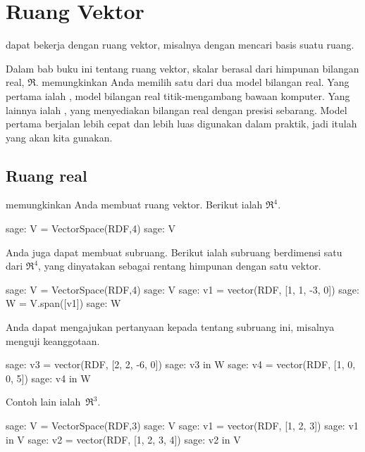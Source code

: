 \chapter{Ruang Vektor}

\Sage{} dapat bekerja dengan ruang vektor, misalnya dengan mencari basis
suatu ruang.

Dalam bab buku ini tentang ruang vektor, skalar berasal
dari himpunan bilangan real, $\Re$.
\Sage{} memungkinkan Anda memilih satu dari dua model bilangan real.
Yang pertama ialah , model bilangan real titik-mengambang
bawaan komputer.
Yang lainnya ialah , yang menyediakan bilangan real 
dengan presisi sebarang.
Model pertama berjalan lebih cepat
dan lebih luas digunakan dalam praktik, jadi itulah yang akan kita gunakan.
 




\section{Ruang real}

\Sage{} memungkinkan Anda membuat ruang vektor.
Berikut ialah $\Re^4$.
\begin{sagecommandline}
sage: V = VectorSpace(RDF,4)
sage: V
\end{sagecommandline}
Anda juga dapat membuat subruang.
Berikut ialah subruang berdimensi satu dari $\Re^4$, yang dinyatakan sebagai rentang
himpunan dengan satu vektor.
\begin{sagecommandline}
sage: V = VectorSpace(RDF,4)
sage: V
sage: v1 = vector(RDF, [1, 1, -3, 0])
sage: W = V.span([v1])
sage: W
\end{sagecommandline}

Anda dapat mengajukan pertanyaan kepada \Sage{} tentang subruang ini, misalnya 
menguji keanggotaan. 
\begin{sagecommandline}
sage: v3 = vector(RDF, [2, 2, -6, 0])
sage: v3 in W
sage: v4 = vector(RDF, [1, 0, 0, 5])
sage: v4 in W
\end{sagecommandline}

Contoh lain ialah~$\Re^3$.
\begin{sagecommandline}
sage: V = VectorSpace(RDF,3)
sage: V
sage: v1 = vector(RDF, [1, 2, 3])
sage: v1 in V
sage: v2 = vector(RDF, [1, 2, 3, 4])
sage: v2 in V
\end{sagecommandline}

